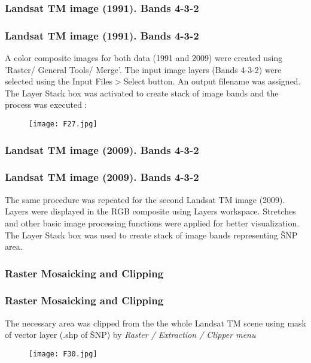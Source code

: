 \documentclass[pdflatex,compress,8pt,
	xcolor={dvipsnames,dvipsnames,svgnames,x11names,table},
	hyperref={
	breaklinks = true, 
	pdfauthor={Lemenkova Polina}, 
	pdfsubject={Preentation}, 
	pdfcreator={Lemenkova Polina}, 
	pdfproducer={Lemenkova Polina}, 
	colorlinks=true,linkcolor=blue, 
	citecolor=NavyBlue, 
	urlcolor = NavyBlue, 
	breaklinks = true}]{beamer}
\begin{document}
\subsubsection{Landsat TM image (1991). Bands 4-3-2}
\begin{frame}\frametitle{Landsat TM image (1991). Bands 4-3-2}
A color composite images for both data (1991 and 2009) were created using 'Raster/ General Tools/ Merge'.
The input image layers (Bands 4-3-2) were selected using the Input Files$>$Select button. An output filename was assigned. The Layer Stack box was activated to create stack of image bands and the process was executed :
\begin{figure}[H]
	\centering
		\texttt{[image: F27.jpg]}
\end{figure}
\end{frame}

\subsubsection{Landsat TM image (2009). Bands 4-3-2}
\begin{frame}\frametitle{Landsat TM image (2009). Bands 4-3-2}
The same procedure was repeated for the second Landsat TM image (2009). Layers were displayed in the RGB composite using Layers workspace. Stretches and other basic image processing functions were applied for better visualization.
The Layer Stack box was used to create stack of image bands representing ŠNP area.
\begin{figure}[H]
	\centering
			\hspace{5mm}
\end{figure}
\end{frame}

\subsubsection{Raster Mosaicking and Clipping}
\begin{frame}\frametitle{Raster Mosaicking and Clipping}
The necessary area was clipped from the the whole Landsat TM scene using mask of vector layer (.shp of ŠNP) by \emph{Raster / Extraction / Clipper menu}
\begin{figure}[H]
	\centering
		\texttt{[image: F30.jpg]}
\end{figure}
\end{frame}
\end{document}
